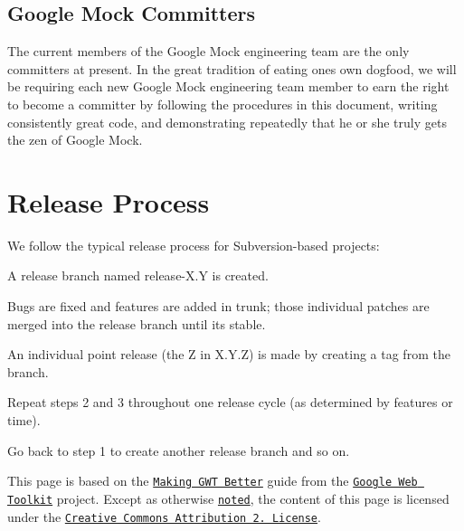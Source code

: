 \subsection*{Google Mock Committers}

The current members of the Google Mock engineering team are the only committers at present. In the great tradition of eating one\textquotesingle{}s own dogfood, we will be requiring each new Google Mock engineering team member to earn the right to become a committer by following the procedures in this document, writing consistently great code, and demonstrating repeatedly that he or she truly gets the zen of Google Mock.

\section*{Release Process}

We follow the typical release process for Subversion-\/based projects\+:


\begin{DoxyEnumerate}
\item A release branch named {\ttfamily release-\/\+X.\+Y} is created.
\end{DoxyEnumerate}
\begin{DoxyEnumerate}
\item Bugs are fixed and features are added in trunk; those individual patches are merged into the release branch until it\textquotesingle{}s stable.
\end{DoxyEnumerate}
\begin{DoxyEnumerate}
\item An individual point release (the {\ttfamily Z} in {\ttfamily X.\+Y.\+Z}) is made by creating a tag from the branch.
\end{DoxyEnumerate}
\begin{DoxyEnumerate}
\item Repeat steps 2 and 3 throughout one release cycle (as determined by features or time).
\end{DoxyEnumerate}
\begin{DoxyEnumerate}
\item Go back to step 1 to create another release branch and so on.
\end{DoxyEnumerate}





This page is based on the \href{http://code.google.com/webtoolkit/makinggwtbetter.html}{\tt Making G\+WT Better} guide from the \href{http://code.google.com/webtoolkit/}{\tt Google Web Toolkit} project. Except as otherwise \href{http://code.google.com/policies.html#restrictions}{\tt noted}, the content of this page is licensed under the \href{http://creativecommons.org/licenses/by/2.5/}{\tt Creative Commons Attribution 2. License}. 